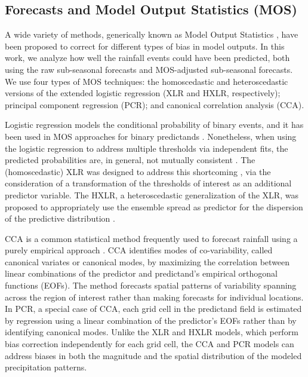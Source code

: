\documentclass{ametsoc}
\begin{document}
\subsection{Forecasts and Model Output Statistics (MOS)}

A wide variety of methods, generically known as Model Output Statistics \citep[MOS;][]{Glahn:1972vt}, have been proposed to correct for different types of bias in model outputs.
In this work, we analyze how well the rainfall events could have been predicted, both using the raw sub-seasonal forecasts and  MOS-adjusted sub-seasonal forecasts.
We use  four types of MOS techniques: the homoscedastic and heteroscedastic versions of the extended logistic regression (XLR and HXLR, respectively); principal component regression (PCR); and canonical correlation analysis (CCA).

Logistic regression models the conditional probability of binary events, and it has been used in MOS approaches for binary predictands \citep{Hamill:2004hk}.
Nonetheless, when using the logistic regression to address multiple thresholds via independent fits, the predicted probabilities are, in general, not mutually consistent \citep{Messner:2014gp}.
The (homoscedastic) XLR was designed to address this shortcoming \citep{Wilks:2009bk}, via the consideration of a transformation of the thresholds of interest as an additional predictor variable.
The HXLR, a heteroscedastic generalization of the XLR, was proposed to appropriately use the ensemble spread as predictor for the dispersion of the predictive distribution \citep{Messner:2014gp}.

CCA is a common statistical method frequently used to forecast rainfall using a purely empirical approach \citep{Mason:2008da,Barnston:2012ce,Jolliffe2012:vm,Barnston:1992gd,Wilks:2006fx}.
CCA identifies modes of co-variability, called canonical variates or canonical modes, by maximizing the correlation between linear combinations of the predictor and predictand's empirical orthogonal functions (EOFs).
The method forecasts spatial patterns of variability spanning across the region of interest rather than making forecasts for individual locations.
In PCR, a special case of CCA, each grid cell in the predictand field is estimated by regression using a linear combination of the predictor's EOFs \citep{Mason:2008da,Wilks:2006fx} rather than by identifying canonical modes.
Unlike the XLR and HXLR models, which perform bias correction independently for each grid cell, the CCA and PCR models can address biases in both the magnitude and the spatial distribution of the modeled precipitation patterns.
\end{document}
